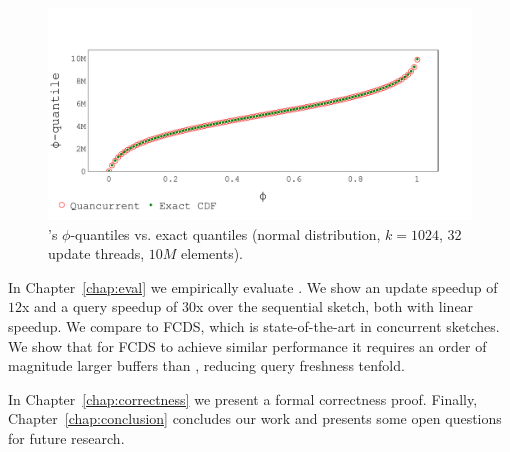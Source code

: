 \begin{figure}[htp]
    \centering
    \includegraphics[width=\linewidth,trim={0cm 0.3cm 0cm 1.5cm},clip]
    {graphics/graphs/accuracy/Oracle_Quancurrent_blocking_numa_cdf_normal_k1024_b16_keys10M_runs1_uT32_qT1_snapshot1_17-09-2022_07-00-49.pdf}
    \caption{\mysketch's $\phi$-quantiles vs. exact quantiles (normal distribution, $k=1024$, $32$ update threads, $10M$ elements).}
    \label{fig:intro-query-accuracy}
\end{figure}


In Chapter~\ref{chap:eval} we empirically evaluate \mysketch. We show an update speedup of $12$x and a query speedup of $30$x over the sequential sketch, both with linear speedup. We compare \mysketch to FCDS, which is state-of-the-art in concurrent sketches. We show that for FCDS to achieve similar performance it requires an order of magnitude larger buffers than \mysketch, reducing query freshness tenfold.

In Chapter~\ref{chap:correctness} we present a formal correctness proof. Finally, Chapter~\ref{chap:conclusion} concludes our work and presents some open questions for future research. 


